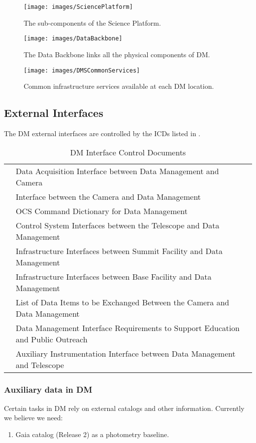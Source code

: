 \begin{figure}[htbp]
\begin{center}
\texttt{[image: images/SciencePlatform]}
\caption{The sub-components of the Science Platform. \label{fig:sciplat}}
\end{center}
\end{figure}


\begin{figure}[htbp]
\begin{center}
\texttt{[image: images/DataBackbone]}
\caption{The Data Backbone links all the physical components of DM. \label{fig:databb}}
\end{center}
\end{figure}

\begin{figure}[htbp]
\begin{center}
 \texttt{[image: images/DMSCommonServices]}
\caption{Common infrastructure services available at each DM location. \label{fig:dcs}}
\end{center}
\end{figure}



\subsection{External Interfaces}
The DM external interfaces are controlled by the  ICDs listed in .
\begin{table}
	\caption{DM Interface Control Documents \label{tab:icds}}
	\begin{tabular}{l p{}}
		\citeds{LSE-68} & Data Acquisition Interface between Data Management and Camera\\
		\citeds{LSE-69} & Interface between the Camera and Data Management	 \\
		\citeds{LSE-72} & OCS Command Dictionary for Data Management\\
		\citeds{LSE-75} & Control System Interfaces between the Telescope and Data Management\\
		\citeds{LSE-76} & Infrastructure Interfaces between Summit Facility and Data Management\\
		\citeds{LSE-77} & Infrastructure Interfaces between Base Facility and Data Management\\
		\citeds{LSE-130} & List of Data Items to be Exchanged Between the Camera and Data Management\\
		\citeds{LSE-131} & Data Management Interface Requirements to Support Education and Public Outreach \\
		\citeds{LSE-140} & Auxiliary Instrumentation Interface between Data Management and Telescope\\
	\end{tabular}
\end{table}

\subsubsection{Auxiliary data in DM}
Certain tasks in DM rely on external catalogs and other information. Currently we believe we need:
\begin{enumerate}
\item Gaia catalog (Release 2) as a photometry baseline.
\end{enumerate}
